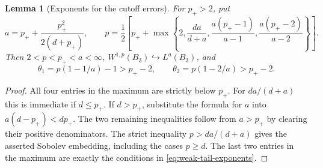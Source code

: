\documentclass[11pt,a4paper]{article}
\numberwithin{equation}{section}
\newtheorem{lemma}[theorem]{Lemma}
\theoremstyle{definition}
\theoremstyle{remark}\newtheorem{remark}[theorem]{Remark}
\begin{document}
\begin{lemma}[Exponents for the cutoff errors]\label{lem:weak-exponents}
For \(p_+>2\), put
\[
 a=p_++\frac{p_+^2}{2(d+p_+)},\qquad
 p=\frac12\left[p_++\max\left\{
 2,\frac{da}{d+a},\frac{a(p_+-1)}{a-1},
                    \frac{a(p_+-2)}{a-2}\right\}\right].
\]
Then \(2<p<p_+<a<\infty\), \(W^{1,p}(B_3)\hookrightarrow L^a(B_3)\),
and
\begin{equation}\label{eq:weak-tail-exponents}
 \theta_1=p(1-1/a)-1>p_+-2,\qquad
 \theta_2=p(1-2/a)>p_+-2.
\end{equation}
\end{lemma}
\begin{proof}
All four entries in the maximum are strictly below \(p_+\).
For \(da/(d+a)\) this is immediate if \(d\leq p_+\). If
\(d>p_+\), substitute the formula for \(a\) into
\(a(d-p_+)<dp_+\). The two remaining inequalities follow from
\(a>p_+\) by clearing their positive denominators.
The strict inequality \(p>da/(d+a)\) gives the asserted Sobolev
embedding, including the cases \(p\geq d\). The last two entries
in the maximum are exactly the conditions in
\eqref{eq:weak-tail-exponents}.
\end{proof}
\end{document}
